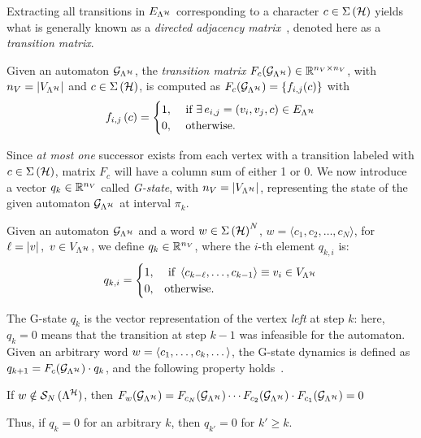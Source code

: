 Extracting all transitions in $E_{\Lambda^{\mathcal{H}}}$ corresponding to a character $c \in \Sigma\left(\mathcal{H}\right)$ yields what is generally known as a \emph{directed adjacency matrix}~\cite{xu2012matrix}, denoted here as a \emph{transition matrix}.
\begin{definition}%
    \label{def:transition}%
    Given an automaton $\mathcal{G}_{\Lambda^{\mathcal{H}}}$, the \emph{transition matrix} $F_{c} ( \mathcal{G}_{\Lambda^{\mathcal{H}}} ) \in \mathbb{R}^{n_V\times n_V}$, with $n_V =\left|V_{\Lambda^{\mathcal{H}}}\right| $ and $c \in \Sigma\left(\mathcal{H}\right)$, is computed as $F_{c} ( \mathcal{G}_{\Lambda^{\mathcal{H}}} ) = \{f_{i,j}(c)\}$ with
    \begin{equation*}
        f_{i,j}\left(c\right)=
        \begin{cases}
            1, &\text{ if } \exists \, e_{i, j} = (v_i,v_j,c) \in E_{\Lambda^{\mathcal{H}}} \\
            0, &\text{ otherwise.}
        \end{cases}
        \end{equation*}%
\end{definition}
%
Since \emph{at most one} successor exists from each vertex with a transition labeled with $c \in \Sigma\left(\mathcal{H}\right)$, matrix $F_c$ will have a column sum of either 1 or 0.
We now introduce a vector $q_k \in \mathbb{R}^{n_V}$ called \emph{G-state}, with $n_V =\left|V_{\Lambda^{\mathcal{H}}}\right| $, representing the state of the given automaton $\mathcal{G}_{\Lambda^{\mathcal{H}}}$ at interval $\pi_k$.
\begin{definition}[G-state $q_k$]%
    \label{def:qt}%
    Given an automaton $\mathcal{G}_{\Lambda^{\mathcal{H}}}$ and a word $w \in \Sigma\left( \mathcal{H} \right)^N$, $w=\langle c_1,c_2,\dots,c_N \rangle$, for $\ell = \left|v\right|,\,\, v\in V_{\Lambda^{\mathcal{H}}}$, we define $q_k\in \mathbb{R}^{n_V}$, where the $i$-th element $q_{k,i}$ is:
    \begin{equation*}
        q_{k,i}=
        \begin{cases}
            1, &\text{ if } \left\langle c_{k-\ell},\dots,c_{k-1}\right\rangle \equiv v_i \in V_{\Lambda^{\mathcal{H}}} \\
            0, &\text{otherwise}.
        \end{cases}
    \end{equation*}
\end{definition}
The G-state $q_k$ is the vector representation of the vertex \emph{left} at step $k$: here, $q_k=0$ means that the transition at step $k-1$ was infeasible for the automaton. 
Given an arbitrary word $w=\left\langle c_1,\dots,c_k,\dots\right\rangle$, the G-state dynamics is defined as $q_{k+1} = F_{c} ( \mathcal{G}_{\Lambda^{\mathcal{H}}} )\cdot q_k$, and the following property holds~\cite{xu2012matrix}.
\begin{lemma}%
    \label{cor:Fseqnotinlambda}%
    If $w \notin \mathcal{S}_{N}\,(\Lambda^{\mathcal{H}})$, then $F_{w} ( \mathcal{G}_{\Lambda^{\mathcal{H}}} ) = F_{c_N} ( \mathcal{G}_{\Lambda^{\mathcal{H}}} )\cdots F_{c_2} ( \mathcal{G}_{\Lambda^{\mathcal{H}}} )\cdot F_{c_1} ( \mathcal{G}_{\Lambda^{\mathcal{H}}} ) = 0$
\end{lemma}
Thus, if $q_k=0$ for an arbitrary $k$, then $q_{k'}=0$ for $k' \geq k$.
